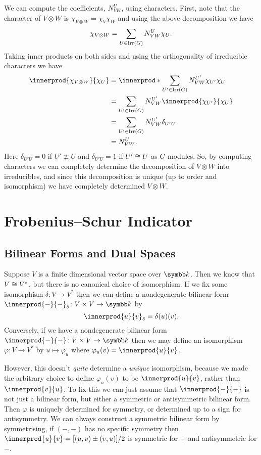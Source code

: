 We can compute the coefficients, \(N^U_{VW}\), using characters.
First, note that the character of \(V \otimes W\) is \(\chi_{V \otimes W} = \chi_V \chi_W\) and using the above decomposition we have
\begin{equation}
    \chi_{V \otimes W} = \sum_{U \in \operatorname{Irr}(G)} N^U_{VW} \chi_U.
\end{equation}
Taking inner products on both sides and using the orthogonality of irreducible characters we have
\begin{align}
    \innerprod{\chi_{V \otimes W}}{\chi_U} &= \innerprod*{\sum_{U' \in \Irr(G)} N^{U'}_{VW}\chi_{U'}}{\chi_U}\\
    &= \sum_{U' \in \Irr(G)} N^{U'}_{VW} \innerprod{\chi_{U'}}{\chi_U}\\
    &= \sum_{U' \in \Irr(G)} N^{U'}_{VW} \delta_{U'U}\\
    &= N^U_{VW}.
\end{align}
Here \(\delta_{U'U} = 0\) if \(U' \ncong U\) and \(\delta_{U'U} = 1\) if \(U' \cong U\) as \(G\)-modules.
So, by computing characters we can completely determine the decomposition of \(V \otimes W\) into irreducibles, and since this decomposition is unique (up to order and isomorphism) we have completely determined \(V \otimes W\).

\section{Frobenius--Schur Indicator}
\subsection{Bilinear Forms and Dual Spaces}
Suppose \(V\) is a finite dimensional vector space over \(\field\).
Then we know that \(V \cong V^*\), but there is no canonical choice of isomorphism.
If we fix some isomorphism \(\delta \colon V \to V^*\) then we can define a nondegenerate bilinear form \(\innerprod{-}{-}_\delta \colon V \times V \to \field\) by
\begin{equation}
    \innerprod{u}{v}_\delta = \delta(u)(v). 
\end{equation}
Conversely, if we have a nondegenerate bilinear form \(\innerprod{-}{-} \colon V \times V \to \field\) then we may define an isomorphism \(\varphi \colon V \to V^*\) by \(u \mapsto \varphi_u\) where \(\varphi_u(v) = \innerprod{u}{v}\).

However, this doesn't \emph{quite} determine a \emph{unique} isomorphism, because we made the arbitrary choice to define \(\varphi_u(v)\) to be \(\innerprod{u}{v}\), rather than \(\innerprod{v}{u}\).
To fix this we can just assume that \(\innerprod{-}{-}\) is not just a bilinear form, but either a symmetric or antisymmetric bilinear form.
Then \(\varphi\) is uniquely determined for symmetry, or determined up to a sign for antisymmetry.
We can always construct a symmetric bilinear form by symmetrising, if \((-,-)\) has no specific symmetry then \(\innerprod{u}{v} = [(u, v) \pm (v, u)]/2\) is symmetric for \(+\) and antisymmetric for \(-\).

